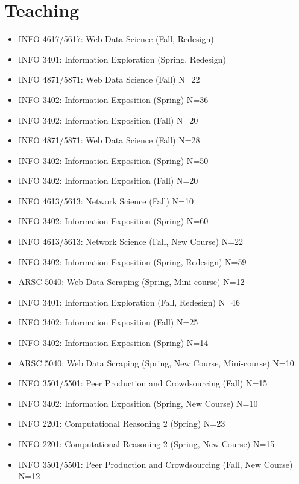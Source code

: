 \documentclass{cv}
\begin{document}
	\section{Teaching}
	\begin{itemize}
		\item[\textit{2026}] INFO 4617/5617: Web Data Science (Fall, Redesign)
		\item[] INFO 3401: Information Exploration (Spring, Redesign)

		\item[\textit{2024}] INFO 4871/5871: Web Data Science (Fall) \hfill N=22
		\item[] INFO 3402: Information Exposition (Spring) \hfill N=36

		\item[\textit{2023}] INFO 3402: Information Exposition (Fall) \hfill N=20
		\item[] INFO 4871/5871: Web Data Science (Fall) \hfill N=28
		\item[] INFO 3402: Information Exposition (Spring) \hfill N=50

		\item[\textit{2022}] INFO 3402: Information Exposition (Fall) \hfill N=20
		\item[] INFO 4613/5613: Network Science (Fall) \hfill N=10
		\item[] INFO 3402: Information Exposition (Spring) \hfill N=60

		\item[\textit{2021}] INFO 4613/5613: Network Science (Fall, New Course) \hfill N=22
		\item[] INFO 3402: Information Exposition (Spring, Redesign) \hfill N=59
		\item[] ARSC 5040: Web Data Scraping (Spring, Mini-course) \hfill N=12

		\item[\textit{2020}] INFO 3401: Information Exploration (Fall, Redesign) \hfill N=46

		\item[\textit{2019}] INFO 3402: Information Exposition (Fall) \hfill N=25
		\item[] INFO 3402: Information Exposition (Spring) \hfill N=14
		\item[] ARSC 5040: Web Data Scraping (Spring, New Course, Mini-course) \hfill N=10

		\item[\textit{2018}] INFO 3501/5501: Peer Production and Crowdsourcing (Fall) \hfill N=15
		\item[] INFO 3402: Information Exposition (Spring, New Course) \hfill N=10
		\item[] INFO 2201: Computational Reasoning 2 (Spring)  \hfill N=23

		\item[\textit{2017}] INFO 2201: Computational Reasoning 2 (Spring, New Course)  \hfill N=15

		\item[\textit{2016}] INFO 3501/5501: Peer Production and Crowdsourcing (Fall, New Course) \hfill N=12
	\end{itemize}
\end{document}
